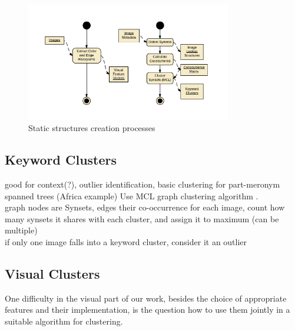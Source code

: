 \begin{figure}[h]
\includegraphics[width=0.8\textwidth]{images/precalcs_activity_diagram.pdf}
\caption{Static structures creation processes}
\label{fig_precalcprocess}
\end{figure}


\subsection{Keyword Clusters}
\label{sec_keywordclustering}
good for context(?), outlier identification, basic clustering for part-meronym spanned trees (Africa example)
\bigskip
Use MCL graph clustering algorithm\cite{Dongen1998} .\\
graph nodes are Synsets, edges their co-occurrence
\bigskip
for each image, count how many synsets it shares with each cluster, and assign it to maximum (can be multiple)\\
if only one image falls into a keyword cluster, consider it an outlier

\subsection{Visual Clusters}
\label{sec_visualclustering}

One difficulty in the visual part of our work, besides the choice of appropriate features and their implementation, is the question how to use them jointly in a suitable algorithm for clustering. 

